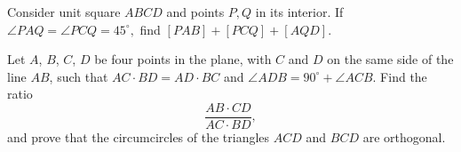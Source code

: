 \documentclass[mast]{lucky}
\begin{document}
    \begin{prob}[]{13}
Consider unit square $ABCD$ and points $P,Q$ in its interior. If $\angle PAQ=\angle PCQ=45^{\circ},$ find $[PAB]+[PCQ]+[AQD].$
\end{prob}

    \begin{prob}[IMO 1993/2]{13}
Let $A$, $B$, $C$, $D$ be four points in the plane, with $C$ and $D$ on the same side of the line $AB$, such that $AC \cdot BD = AD \cdot BC$ and $\angle ADB = 90^{\circ}+\angle ACB$. Find the ratio
\[\frac{AB \cdot CD}{AC \cdot BD}, \]
and prove that the circumcircles of the triangles $ACD$ and $BCD$ are orthogonal.
\end{prob}
\end{document}
